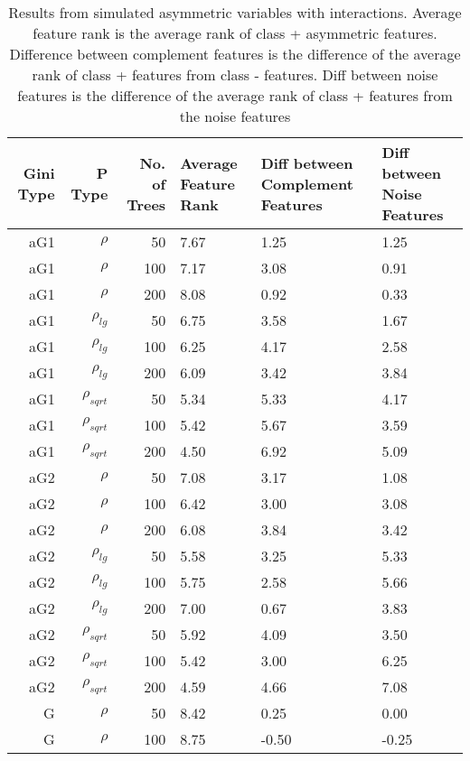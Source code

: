 \begin{table}%
  \centering
  \caption{Results from simulated asymmetric variables with interactions. Average feature rank is the average rank of class + asymmetric features. Difference between complement features is the difference of the average rank of class + features from class - features. Diff between noise features is the difference of the average rank of class + features from the noise features}
\begin{tabular}{rrrp{2.5cm}p{2.5cm}p{2.5cm}}
\hline
Gini Type & P Type & No. of Trees & Average Feature Rank & Diff between Complement Features & Diff between Noise Features \bigstrut\\
\hline
\renewcommand{\arraystretch}{.5}
aG1   & $\rho$ & 50    & 7.67  & 1.25  & 1.25 \bigstrut[t]\\
aG1   & $\rho$ & 100   & 7.17  & 3.08  & 0.91 \\
aG1   & $\rho$ & 200   & 8.08  & 0.92  & 0.33 \\
aG1   & $\rho_{lg}$ & 50    & 6.75  & 3.58  & 1.67 \\
aG1   & $\rho_{lg}$ & 100   & 6.25  & 4.17  & 2.58 \\
aG1   & $\rho_{lg}$ & 200   & 6.09  & 3.42  & 3.84 \\
aG1   & $\rho_{sqrt}$ & 50    & 5.34  & 5.33  & 4.17 \\
aG1   & $\rho_{sqrt}$ & 100   & 5.42  & 5.67  & 3.59 \\
aG1   & $\rho_{sqrt}$ & 200   & 4.50  & 6.92  & 5.09 \\
aG2   & $\rho$ & 50    & 7.08  & 3.17  & 1.08 \\
aG2   & $\rho$ & 100   & 6.42  & 3.00  & 3.08 \\
aG2   & $\rho$ & 200   & 6.08  & 3.84  & 3.42 \\
aG2   & $\rho_{lg}$ & 50    & 5.58  & 3.25  & 5.33 \\
aG2   & $\rho_{lg}$ & 100   & 5.75  & 2.58  & 5.66 \\
aG2   & $\rho_{lg}$ & 200   & 7.00  & 0.67  & 3.83 \\
aG2   & $\rho_{sqrt}$ & 50    & 5.92  & 4.09  & 3.50 \\
aG2   & $\rho_{sqrt}$ & 100   & 5.42  & 3.00  & 6.25 \\
aG2   & $\rho_{sqrt}$ & 200   & 4.59  & 4.66  & 7.08 \\
G     & $\rho$ & 50    & 8.42  & 0.25  & 0.00 \\
G     & $\rho$ & 100   & 8.75  & -0.50 & -0.25 \\

\end{tabular}
\end{table}
